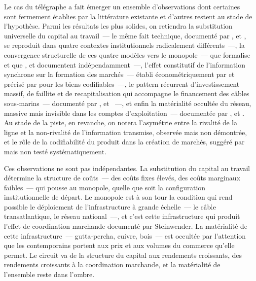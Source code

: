 
Le cas du télégraphe a fait émerger un ensemble d'observations dont certaines sont fermement établies par la littérature existante et d'autres restent au stade de l'hypothèse. Parmi les résultats les plus solides, on retiendra la substitution universelle du capital au travail~--- le même fait technique, documenté par \textcite{gordon_capital_nineteenth}, \textcite{holzmann_early_1995} et \textcite{gabler_american_1988}, se reproduit dans quatre contextes institutionnels radicalement différents~---, la convergence structurelle de ces quatre modèles vers le monopole~--- que \textcite{wu2010master} formalise et que \textcite{nonnenmacher_telegraph_2001}, \textcite{kieve_electric_1973} et \textcite{bertho_histoire_1984} documentent indépendamment~---, l'effet constitutif de l'information synchrone sur la formation des marchés~--- établi économétriquement par \textcite{steinwender_real_2018} et précisé par \textcite{juhasz_spinning_2018} pour les biens codifiables~---, le pattern récurrent d'investissement massif, de faillite et de recapitalisation qui accompagne le financement des câbles sous-marins~--- documenté par \textcite{gordon_thread_2002}, \textcite{bata_cables_1982} et \textcite{headrick_invisible_1991}~---, et enfin la matérialité occultée du réseau, massive mais invisible dans les comptes d'exploitation~--- documentée par \textcite{tully_victorian_2009}, \textcite{fitzmaurice_material_2023} et \textcite{hunt_imperial_2021}. Au stade de la piste, en revanche, on notera l'asymétrie entre la rivalité de la ligne et la non-rivalité de l'information transmise, observée mais non démontrée, et le rôle de la codifiabilité du produit dans la création de marchés, suggéré par \textcite{juhasz_spinning_2018} mais non testé systématiquement.

Ces observations ne sont pas indépendantes. La substitution du capital au travail détermine la structure de coûts~--- des coûts fixes élevés, des coûts marginaux faibles~--- qui pousse au monopole, quelle que soit la configuration institutionnelle de départ. Le monopole est à son tour la condition qui rend possible le déploiement de l'infrastructure à grande échelle~--- le câble transatlantique, le réseau national~---, et c'est cette infrastructure qui produit l'effet de coordination marchande documenté par Steinwender. La matérialité de cette infrastructure~--- gutta-percha, cuivre, bois~--- est occultée par l'attention que les contemporains portent aux prix et aux volumes du commerce qu'elle permet. Le circuit va de la structure du capital aux rendements croissants, des rendements croissants à la coordination marchande, et la matérialité de l'ensemble reste dans l'ombre.

